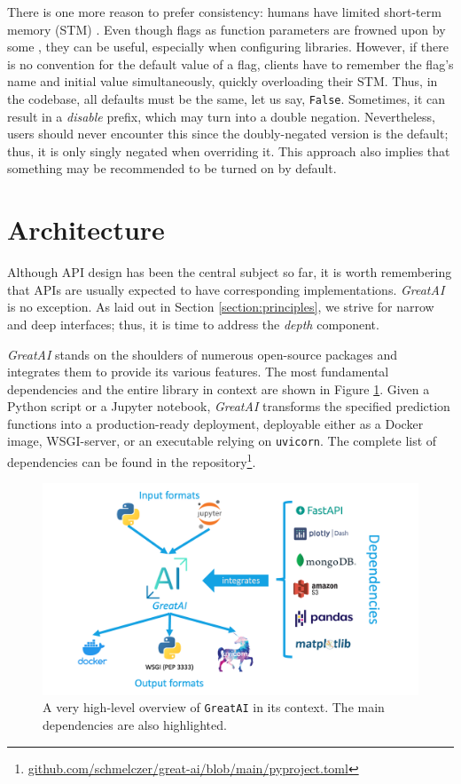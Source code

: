 There is one more reason to prefer consistency: humans have limited short-term memory (STM) \cite{miller1956magical}. Even though flags as function parameters are frowned upon by some \cite{martin2009clean}, they can be useful, especially when configuring libraries. However, if there is no convention for the default value of a flag, clients have to remember the flag's name and initial value simultaneously, quickly overloading their STM. Thus, in the codebase, all defaults must be the same, let us say, \texttt{False}. Sometimes, it can result in a \textit{disable} prefix, which may turn into a double negation. Nevertheless, users should never encounter this since the doubly-negated version is the default; thus, it is only singly negated when overriding it. This approach also implies that something may be recommended to be turned on by default.

\section{Architecture} \label{section:architecture}

Although API design has been the central subject so far, it is worth remembering that APIs are usually expected to have corresponding implementations. \textit{GreatAI} is no exception. As laid out in Section \ref{section:principles}, we strive for narrow and deep interfaces; thus, it is time to address the \textit{depth} component.

\textit{GreatAI} stands on the shoulders of numerous open-source packages and integrates them to provide its various features. The most fundamental dependencies and the entire library in context are shown in Figure \ref{fig:technologies}. Given a Python script or a Jupyter notebook, \textit{GreatAI} transforms the specified prediction functions into a production-ready deployment, deployable either as a Docker image, WSGI-server, or an executable relying on \texttt{uvicorn}. The complete list of dependencies can be found in the repository\footnote{\href{https://github.com/schmelczer/great-ai/blob/main/pyproject.toml}{github.com/schmelczer/great-ai/blob/main/pyproject.toml}}.

\begin{figure}
    \centering
    \includegraphics[width=0.65\linewidth]{figures/technologies.png}
    \captionsetup{width=.9\linewidth}
    \caption{A very high-level overview of \texttt{GreatAI} in its context. The main dependencies are also highlighted.}
    \label{fig:technologies}
\end{figure}

